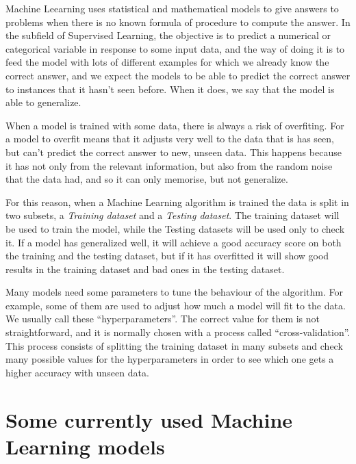 \begin{pre-delivery}
  Machine Leearning uses statistical and mathematical models to give answers to
  problems when there is no known formula of procedure to compute the answer.
  In the subfield of Supervised Learning, the objective is to predict a numerical
  or categorical variable in response to some input data, and the way of doing
  it is to feed the model with lots of different examples for which we already
  know the correct answer, and we expect the models to be able to predict
  the correct answer to instances that it hasn't seen before. When it does,
  we say that the model is able to generalize.

  When a model is trained with some data, there is always a risk of overfiting.
  For a model to overfit means that it adjusts very well to the data that is
  has seen, but can't predict the correct answer to new, unseen data. This
  happens because it has not only from the relevant information, but also
  from the random noise that the data had, and so it can only memorise, but
  not generalize.

  For this reason, when a Machine Learning algorithm is trained the data
  is split in two subsets, a \textit{Training  dataset} and a \textit{Testing
  dataset}. The training dataset will be used to train the model, while the
  Testing datasets will be used only to check it. If a model has generalized
  well, it will achieve a good accuracy score on both the training and the
  testing dataset, but if it has overfitted it will show good results in the
  training dataset and bad ones in the testing dataset.

  Many models need some parameters to tune the behaviour of the algorithm. For
  example, some of them are used to adjust how much a model will fit to the data.
  We usually call these ``hyperparameters''. The correct value for them is not
  straightforward, and it is normally chosen with a process called
  ``cross-validation''. This process consists of splitting the training dataset
  in many subsets and check many possible values for the hyperparameters in order
  to see which one gets a higher accuracy with unseen data.
\end{pre-delivery}

\section{Some currently used Machine Learning models}


